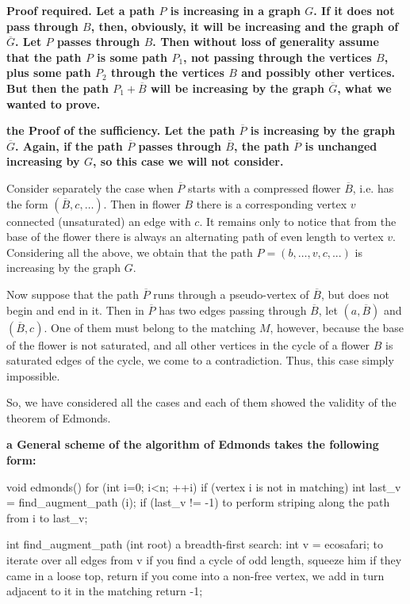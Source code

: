 \bf{Proof required}. Let a path $P$ is increasing in a graph $G$. If it does not pass through $B$, then, obviously, it will be increasing and the graph of $\overline G$. Let $P$ passes through $B$. Then without loss of generality assume that the path $P$ is some path $P_1$, not passing through the vertices $B$, plus some path $P_2$ through the vertices $B$ and possibly other vertices. But then the path $P_1 + \overline B$ will be increasing by the graph $\overline G$, what we wanted to prove.

\bf{the Proof of the sufficiency}. Let the path $\overline P$ is increasing by the graph $\overline G$. Again, if the path $\overline P$ passes through $\overline B$, the path $\overline P$ is unchanged increasing by $G$, so this case we will not consider.

Consider separately the case when $\overline P$ starts with a compressed flower $\overline B$, i.e. has the form $(\overline B, c, \ldots)$. Then in flower $B$ there is a corresponding vertex $v$ connected (unsaturated) an edge with $c$. It remains only to notice that from the base of the flower there is always an alternating path of even length to vertex $v$. Considering all the above, we obtain that the path $P = (b, \ldots, v, c, ...)$ is increasing by the graph $G$.

Now suppose that the path $\overline P$ runs through a pseudo-vertex of $\overline B$, but does not begin and end in it. Then in $\overline P$ has two edges passing through $\overline B$, let $(a, \overline B)$ and $(\overline B, c)$. One of them must belong to the matching $M$, however, because the base of the flower is not saturated, and all other vertices in the cycle of a flower $B$ is saturated edges of the cycle, we come to a contradiction. Thus, this case simply impossible.

So, we have considered all the cases and each of them showed the validity of the theorem of Edmonds.

\bf{a General scheme of the algorithm of Edmonds} takes the following form:

\code
void edmonds() {
for (int i=0; i<n; ++i)
if (vertex i is not in matching) {
int last_v = find_augment_path (i);
if (last_v != -1)
to perform striping along the path from i to last_v;
}
}

int find_augment_path (int root) {
a breadth-first search:
int v = ecosafari;
to iterate over all edges from v
if you find a cycle of odd length, squeeze him
if they came in a loose top, return
if you come into a non-free vertex, we add
in turn adjacent to it in the matching
return -1;
}
\endcode


